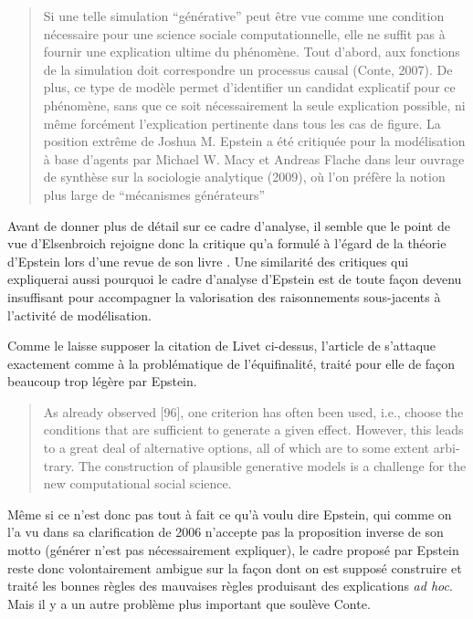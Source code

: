 \blockquote[\cite{Livet2014}]{Si une telle simulation \enquote{générative} peut être vue comme une condition nécessaire pour une science sociale computationnelle, elle ne suffit pas à fournir une explication ultime du phénomène. Tout d’abord, aux fonctions de la simulation doit correspondre un processus causal (Conte, 2007). De plus, ce type de modèle permet d’identifier un candidat explicatif pour ce phénomène, sans que ce soit nécessairement la seule explication possible, ni même forcément l’explication pertinente dans tous les cas de figure. La position extrême de Joshua M. Epstein a été critiquée pour la modélisation à base d’agents par Michael W. Macy et Andreas Flache dans leur ouvrage de synthèse sur la sociologie analytique (2009), où l’on préfère la notion plus large de \enquote{mécanismes générateurs}} 

Avant de donner plus de détail sur ce cadre d'analyse, il semble que le point de vue d'Elsenbroich rejoigne donc la critique qu'a formulé \textcite{Conte2007} à l'égard de la théorie d'Epstein lors d'une revue de son livre \autocite{Epstein2007}. Une similarité des critiques qui expliquerai aussi pourquoi le cadre d'analyse d'Epstein est de toute façon devenu insuffisant pour accompagner la valorisation des raisonnements sous-jacents à l'activité de modélisation.

Comme le laisse supposer la citation de Livet ci-dessus, l'article de \textcites{Conte2007, Conte2012} s'attaque exactement comme \textcite{Yanoff2008} à la problématique de l'équifinalité, traité pour elle de façon beaucoup trop légère par Epstein. 

\foreignblockquote{english}[{\cite[340]{Conte2012}}]{As already observed [96], one criterion has often been used, i.e., choose the conditions that are sufficient to generate a given effect. However, this leads to a great deal of alternative options, all of which are to some extent arbitrary. The construction of plausible generative models is a challenge for the new computational social science.}

Même si ce n'est donc pas tout à fait ce qu'à voulu dire Epstein, qui comme on l'a vu dans sa clarification de 2006 n'accepte pas la proposition inverse de son motto (générer n'est pas nécessairement expliquer), le cadre proposé par Epstein reste donc volontairement ambigue sur la façon dont on est supposé construire et traité les bonnes règles des mauvaises règles produisant des explications \textit{ad hoc}. Mais il y a un autre problème plus important que soulève Conte. 

